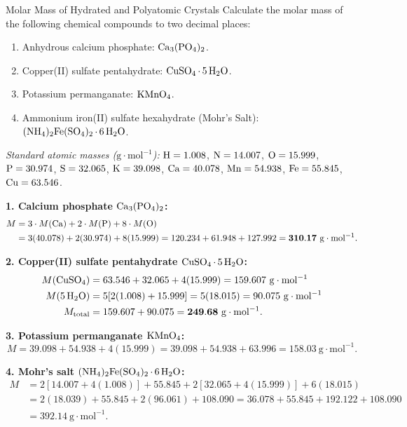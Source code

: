 \begin{exercise}{Molar Mass of Hydrated and Polyatomic Crystals}
Calculate the molar mass of the following chemical compounds to two decimal places:
\begin{enumerate}[leftmargin=1.5em,itemsep=2pt]
  \item Anhydrous calcium phosphate: $\ce{Ca3(PO4)2}$.
  \item Copper(II) sulfate pentahydrate: $\ce{CuSO4*5H2O}$.
  \item Potassium permanganate: $\ce{KMnO4}$.
  \item Ammonium iron(II) sulfate hexahydrate (Mohr's Salt): $(\ce{NH4})_2\ce{Fe(SO4)2*6H2O}$.
\end{enumerate}
\textit{Standard atomic masses ($\mathrm{g\cdot mol^{-1}}$):} $\ce{H} = 1.008$, $\ce{N} = 14.007$, $\ce{O} = 15.999$, $\ce{P} = 30.974$, $\ce{S} = 32.065$, $\ce{K} = 39.098$, $\ce{Ca} = 40.078$, $\ce{Mn} = 54.938$, $\ce{Fe} = 55.845$, $\ce{Cu} = 63.546$.
\end{exercise}

\begin{tabletworkspace}[5.0cm]
\end{tabletworkspace}

\begin{solution}
\textbf{1. Calcium phosphate $\ce{Ca3(PO4)2}$:}
\begin{align*}
M &= 3 \cdot M(\ce{Ca}) + 2 \cdot M(\ce{P}) + 8 \cdot M(\ce{O}) \\
  &= 3(40.078) + 2(30.974) + 8(15.999) = 120.234 + 61.948 + 127.992 = \mathbf{310.17\ \mathrm{g\cdot mol^{-1}}}.
\end{align*}

\textbf{2. Copper(II) sulfate pentahydrate $\ce{CuSO4*5H2O}$:}
\begin{align*}
M(\ce{CuSO4}) &= 63.546 + 32.065 + 4(15.999) = 159.607\ \mathrm{g\cdot mol^{-1}} \\
M(5\,\ce{H2O}) &= 5[2(1.008) + 15.999] = 5(18.015) = 90.075\ \mathrm{g\cdot mol^{-1}} \\
M_{\text{total}} &= 159.607 + 90.075 = \mathbf{249.68\ \mathrm{g\cdot mol^{-1}}}.
\end{align*}

\textbf{3. Potassium permanganate $\ce{KMnO4}$:}
\[
M = 39.098 + 54.938 + 4(15.999) = 39.098 + 54.938 + 63.996 = \mathbf{158.03\ \mathrm{g\cdot mol^{-1}}}.
\]

\textbf{4. Mohr's salt $(\ce{NH4})_2\ce{Fe(SO4)2*6H2O}$:}
\begin{align*}
M &= 2[14.007 + 4(1.008)] + 55.845 + 2[32.065 + 4(15.999)] + 6(18.015) \\
  &= 2(18.039) + 55.845 + 2(96.061) + 108.090 = 36.078 + 55.845 + 192.122 + 108.090 \\
  &= \mathbf{392.14\ \mathrm{g\cdot mol^{-1}}}.
\end{align*}
\end{solution}


